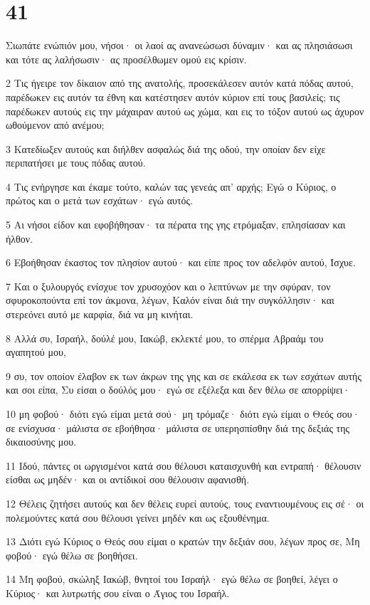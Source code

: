 \chapter{41}

\par Σιωπάτε ενώπιόν μου, νήσοι· οι λαοί ας ανανεώσωσι δύναμιν· και ας πλησιάσωσι και τότε ας λαλήσωσιν· ας προσέλθωμεν ομού εις κρίσιν.
\par 2 Τις ήγειρε τον δίκαιον από της ανατολής, προσεκάλεσεν αυτόν κατά πόδας αυτού, παρέδωκεν εις αυτόν τα έθνη και κατέστησεν αυτόν κύριον επί τους βασιλείς; τις παρέδωκεν αυτούς εις την μάχαιραν αυτού ως χώμα, και εις το τόξον αυτού ως άχυρον ωθούμενον από ανέμου;
\par 3 Κατεδίωξεν αυτούς και διήλθεν ασφαλώς διά της οδού, την οποίαν δεν είχε περιπατήσει με τους πόδας αυτού.
\par 4 Τις ενήργησε και έκαμε τούτο, καλών τας γενεάς απ' αρχής; Εγώ ο Κύριος, ο πρώτος και ο μετά των εσχάτων· εγώ αυτός.
\par 5 Αι νήσοι είδον και εφοβήθησαν· τα πέρατα της γης ετρόμαξαν, επλησίασαν και ήλθον.
\par 6 Εβοήθησαν έκαστος τον πλησίον αυτού· και είπε προς τον αδελφόν αυτού, Ίσχυε.
\par 7 Και ο ξυλουργός ενίσχυε τον χρυσοχόον και ο λεπτύνων με την σφύραν, τον σφυροκοπούντα επί τον άκμονα, λέγων, Καλόν είναι διά την συγκόλλησιν· και στερεόνει αυτό με καρφία, διά να μη κινήται.
\par 8 Αλλά συ, Ισραήλ, δούλέ μου, Ιακώβ, εκλεκτέ μου, το σπέρμα Αβραάμ του αγαπητού μου,
\par 9 συ, τον οποίον έλαβον εκ των άκρων της γης και σε εκάλεσα εκ των εσχάτων αυτής και σοι είπα, Συ είσαι ο δούλός μου· εγώ σε εξέλεξα και δεν θέλω σε απορρίψει·
\par 10 μη φοβού· διότι εγώ είμαι μετά σού· μη τρόμαζε· διότι εγώ είμαι ο Θεός σου· σε ενίσχυσα· μάλιστα σε εβοήθησα· μάλιστα σε υπερησπίσθην διά της δεξιάς της δικαιοσύνης μου.
\par 11 Ιδού, πάντες οι ωργισμένοι κατά σου θέλουσι καταισχυνθή και εντραπή· θέλουσιν είσθαι ως μηδέν· και οι αντίδικοί σου θέλουσιν αφανισθή.
\par 12 Θέλεις ζητήσει αυτούς και δεν θέλεις ευρεί αυτούς, τους εναντιουμένους εις σέ· οι πολεμούντες κατά σου θέλουσι γείνει μηδέν και ως εξουθένημα.
\par 13 Διότι εγώ Κύριος ο Θεός σου είμαι ο κρατών την δεξιάν σου, λέγων προς σε, Μη φοβού· εγώ θέλω σε βοηθήσει.
\par 14 Μη φοβού, σκώληξ Ιακώβ, θνητοί του Ισραήλ· εγώ θέλω σε βοηθεί, λέγει ο Κύριος· και λυτρωτής σου είναι ο Άγιος του Ισραήλ.
